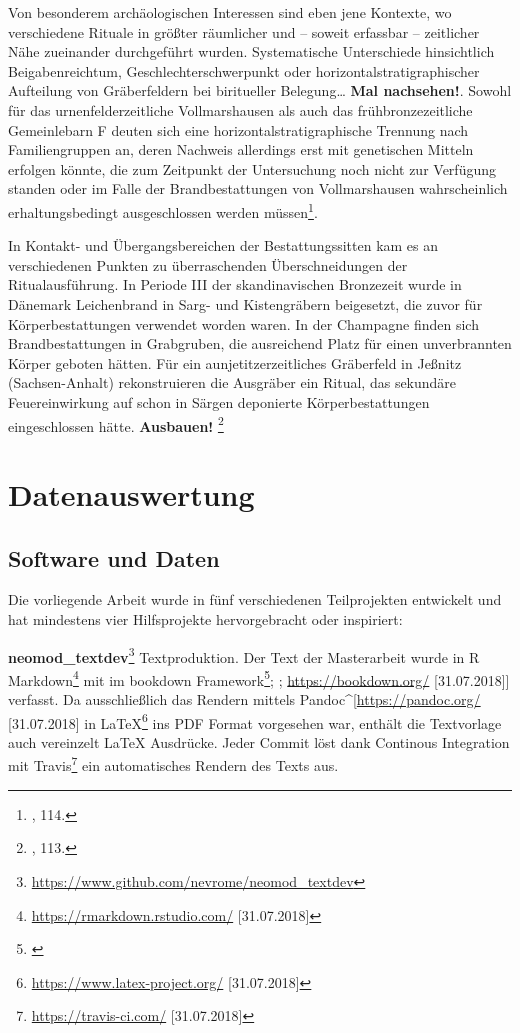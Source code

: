 \documentclass[openany,twoside,twocolumn]{book}
\let\rmarkdownfootnote\footnote%
\def\footnote{\protect\rmarkdownfootnote}
\let\pby\printbibliography
\renewcommand{\printbibliography}{}
\begin{document}
Von besonderem archäologischen Interessen sind eben jene Kontexte, wo
verschiedene Rituale in größter räumlicher und -- soweit erfassbar --
zeitlicher Nähe zueinander durchgeführt wurden. Systematische
Unterschiede hinsichtlich Beigabenreichtum, Geschlechterschwerpunkt oder
horizontalstratigraphischer Aufteilung von Gräberfeldern bei biritueller
Belegung\ldots{} \textbf{Mal nachsehen!}. Sowohl für das
urnenfelderzeitliche Vollmarshausen als auch das frühbronzezeitliche
Gemeinlebarn F deuten sich eine horizontalstratigraphische Trennung nach
Familiengruppen an, deren Nachweis allerdings erst mit genetischen
Mitteln erfolgen könnte, die zum Zeitpunkt der Untersuchung noch nicht
zur Verfügung standen oder im Falle der Brandbestattungen von
Vollmarshausen wahrscheinlich erhaltungsbedingt ausgeschlossen werden
müssen\footnote{\textcite{harding_european_2000}, 114.}.

In Kontakt- und Übergangsbereichen der Bestattungssitten kam es an
verschiedenen Punkten zu überraschenden Überschneidungen der
Ritualausführung. In Periode III der skandinavischen Bronzezeit wurde in
Dänemark Leichenbrand in Sarg- und Kistengräbern beigesetzt, die zuvor
für Körperbestattungen verwendet worden waren. In der Champagne finden
sich Brandbestattungen in Grabgruben, die ausreichend Platz für einen
unverbrannten Körper geboten hätten. Für ein aunjetitzerzeitliches
Gräberfeld in Jeßnitz (Sachsen-Anhalt) rekonstruieren die Ausgräber ein
Ritual, das sekundäre Feuereinwirkung auf schon in Särgen deponierte
Körperbestattungen eingeschlossen hätte. \textbf{Ausbauen!} \footnote{\textcite{harding_european_2000},
  113.}

\newpage
\pby[title={Literatur},segment=\therefsegment,heading=subbibintoc]

\hypertarget{data-analysis}{%
\chapter{Datenauswertung}\label{data-analysis}}

\hypertarget{software-und-daten}{%
\section{Software und Daten}\label{software-und-daten}}

Die vorliegende Arbeit wurde in fünf verschiedenen Teilprojekten
entwickelt und hat mindestens vier Hilfsprojekte hervorgebracht oder
inspiriert:

\textbf{neomod\_textdev}\footnote{\url{https://www.github.com/nevrome/neomod_textdev}}
Textproduktion. Der Text der Masterarbeit wurde in R Markdown\footnote{\url{https://rmarkdown.rstudio.com/}
  {[}31.07.2018{]}} mit im bookdown Framework\footnote{\textcite{xie_bookdown_2016}};
\autocite{xie_bookdown_2018}; \url{https://bookdown.org/}
{[}31.07.2018{]}{]} verfasst. Da ausschließlich das Rendern mittels
Pandoc\^{}{[}\url{https://pandoc.org/} {[}31.07.2018{]} in
LaTeX\footnote{\url{https://www.latex-project.org/} {[}31.07.2018{]}}
ins PDF Format vorgesehen war, enthält die Textvorlage auch vereinzelt
LaTeX Ausdrücke. Jeder Commit löst dank Continous Integration mit
Travis\footnote{\url{https://travis-ci.com/} {[}31.07.2018{]}} ein
automatisches Rendern des Texts aus.
\end{document}
